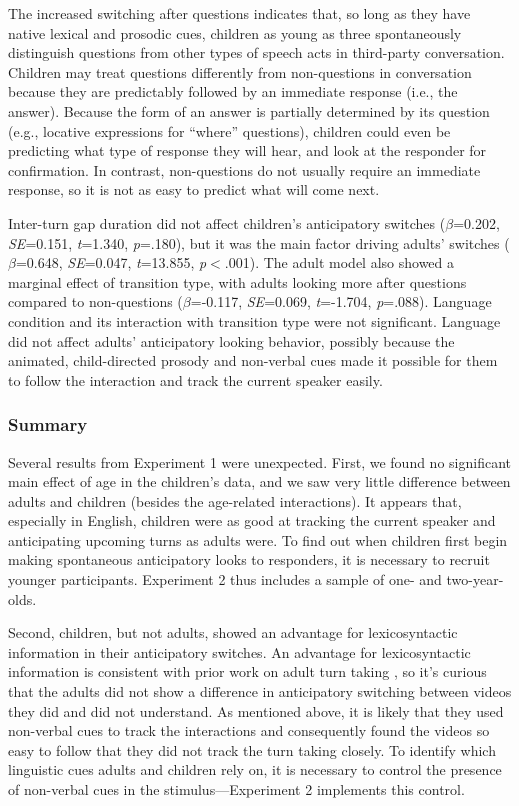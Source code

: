 \documentclass[authoryear, 12pt]{elsarticle}
\begin{document}
The increased switching after questions indicates that, so long as they have native lexical and prosodic cues, children as young as three spontaneously distinguish questions from other types of speech acts in third-party conversation. Children may treat questions differently from non-questions in conversation because they are predictably followed by an immediate response (i.e., the answer). Because the form of an answer is partially determined by its question (e.g., locative expressions for ``where'' questions), children could even be predicting what type of response they will hear, and look at the responder for confirmation. In contrast, non-questions do not usually require an immediate response, so it is not as easy to predict what will come next.

Inter-turn gap duration did not affect children's anticipatory switches (\textit{$\beta$}=0.202, \textit{SE}=0.151, \textit{t}=1.340, \textit{p}=.180), but it was the main factor driving adults' switches (\textit{$\beta$}=0.648, \textit{SE}=0.047, \textit{t}=13.855, \textit{p}$<$.001). The adult model also showed a marginal effect of transition type, with adults looking more after questions compared to non-questions (\textit{$\beta$}=-0.117, \textit{SE}=0.069, \textit{t}=-1.704, \textit{p}=.088). Language condition and its interaction with transition type were not significant. Language did not affect adults' anticipatory looking behavior, possibly because the animated, child-directed prosody and non-verbal cues made it possible for them to follow the interaction and track the current speaker easily.

\subsubsection{Summary}

Several results from Experiment 1 were unexpected. First, we found no significant main effect of age in the children's data, and we saw very little difference between adults and children (besides the age-related interactions). It appears that, especially in English, children were as good at tracking the current speaker and anticipating upcoming turns as adults were. To find out when children first begin making spontaneous anticipatory looks to responders, it is necessary to recruit younger participants. Experiment 2 thus includes a sample of one- and two-year-olds. 

Second, children, but not adults, showed an advantage for lexicosyntactic information in their anticipatory switches. An advantage for lexicosyntactic information is consistent with prior work on adult turn taking \citep{de-ruiter2006}, so it's curious that the adults did not show a difference in anticipatory switching between videos they did and did not understand. As mentioned above, it is likely that they used non-verbal cues to track the interactions and consequently found the videos so easy to follow that they did not track the turn taking closely. To identify which linguistic cues adults and children rely on, it is necessary to control the presence of non-verbal cues in the stimulus---Experiment 2 implements this control.
\end{document}
